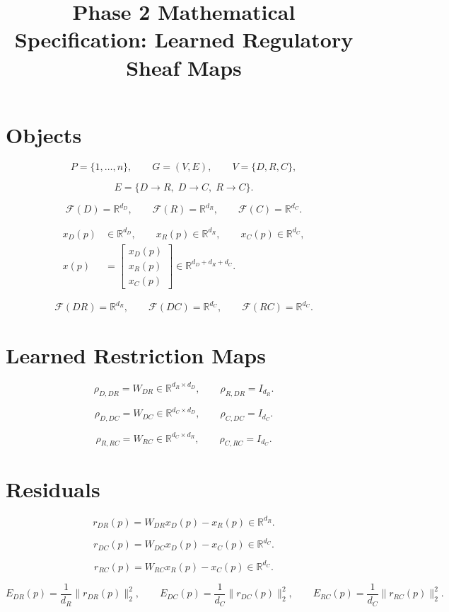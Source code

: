 \documentclass[11pt]{article}
\title{Phase 2 Mathematical Specification: Learned Regulatory Sheaf Maps}
\author{}
\date{}
\begin{document}
\maketitle

\section*{Objects}

\[
P=\{1,\dots,n\},\qquad G=(V,E),\qquad V=\{D,R,C\},
\]

\[
E=\{D\to R,\;D\to C,\;R\to C\}.
\]

\[
\mathcal F(D)=\mathbb R^{d_D},\qquad
\mathcal F(R)=\mathbb R^{d_R},\qquad
\mathcal F(C)=\mathbb R^{d_C}.
\]

\[
\begin{aligned}
 x_D(p)&\in \mathbb R^{d_D},\qquad
 x_R(p)\in \mathbb R^{d_R},\qquad
 x_C(p)\in \mathbb R^{d_C},\\
 x(p)&=\begin{bmatrix}x_D(p)\\x_R(p)\\x_C(p)\end{bmatrix}
 \in \mathbb R^{d_D+d_R+d_C}.
\end{aligned}
\]

\[
\mathcal F(DR)=\mathbb R^{d_R},\qquad
\mathcal F(DC)=\mathbb R^{d_C},\qquad
\mathcal F(RC)=\mathbb R^{d_C}.
\]

\section*{Learned Restriction Maps}

\[
\rho_{D,DR}=W_{DR}\in\mathbb R^{d_R\times d_D},
\qquad
\rho_{R,DR}=I_{d_R}.
\]

\[
\rho_{D,DC}=W_{DC}\in\mathbb R^{d_C\times d_D},
\qquad
\rho_{C,DC}=I_{d_C}.
\]

\[
\rho_{R,RC}=W_{RC}\in\mathbb R^{d_C\times d_R},
\qquad
\rho_{C,RC}=I_{d_C}.
\]

\section*{Residuals}

\[
 r_{DR}(p)=W_{DR}x_D(p)-x_R(p)\in\mathbb R^{d_R}.
\]

\[
 r_{DC}(p)=W_{DC}x_D(p)-x_C(p)\in\mathbb R^{d_C}.
\]

\[
 r_{RC}(p)=W_{RC}x_R(p)-x_C(p)\in\mathbb R^{d_C}.
\]

\[
 E_{DR}(p)=\frac{1}{d_R}\|r_{DR}(p)\|_2^2,
\qquad
 E_{DC}(p)=\frac{1}{d_C}\|r_{DC}(p)\|_2^2,
\qquad
 E_{RC}(p)=\frac{1}{d_C}\|r_{RC}(p)\|_2^2.
\]
\end{document}
